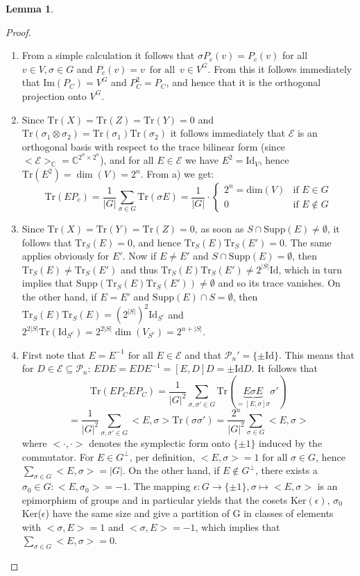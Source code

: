\documentclass[12pt,a4paper,BCOR15mm,twoside,DIV12]{article}
\def\P{\mathcal{P}}
\def\C{\mathbb{C}}
\def\supp{\text{Supp}}
\def\fa{\text{ for all }}
\def\Tr{\text{Tr}}
\def\Id{\text{Id}}
\newenvironment{bew}{\begin{proof}[Proof]}{\end{proof}}
\theoremstyle{definition}
\newtheorem{lem}[Satz]{Lemma}
\begin{document}
\begin{lem}
\begin{bew}
\begin{enumerate}
\item From a simple calculation it follows that $\sigma P_c(v) = P_c(v)$ for all $v \in V, \sigma \in G$ and $P_c(v) = v \, \fa \, v \in V^G$. From this it follows immediately that Im$(P_C) = V^G$ and $P_C^2 = P_C$, and hence that it is the orthogonal projection onto $V^G$.
\item Since $\Tr(X) = \Tr(Z) = \Tr(Y) = 0$ and $\Tr(\sigma_1 \otimes \sigma_2) = \Tr(\sigma_1)\Tr(\sigma_2)$ it follows immediately that $\mathcal{E}$ is an orthogonal basis with respect to the trace bilinear form (since $<\mathcal{E}>_\C = \C^{2^n \times 2^n}$), and for all $E \in \mathcal{E}$ we have $E^2 = \Id_V$, hence $\Tr(E^2) = \dim(V) = 2^n$.
From a) we get: \begin{equation} \Tr( E P_c) = \frac{1}{|G|} \sum_{\sigma \in G} \Tr(\sigma E) = \frac{1}{|G|} \cdot \left\{ \begin{array}{lr} 2^n = \text{dim}(V) & \text{if } E \in G \\ 0 & \text{if } E \notin G \end{array} \right. \end{equation}
\item Since $\Tr(X) = \Tr(Y) = \Tr(Z) = 0$, as soon as $S \cap \supp(E) \neq \emptyset$, it follows that $\Tr_S(E) = 0$, and hence $\Tr_S(E)\Tr_S(E') = 0$. The same applies obviously for $E'$. Now if $E \neq E'$ and $S \cap \supp(E) = \emptyset$, then $\Tr_S(E) \neq \Tr_S(E')$ and thus $\Tr_S(E)\Tr_S(E') \neq 2^{|S|} \Id $, which in turn implies that $\supp(\Tr_S(E)\Tr_S(E')) \neq \emptyset$ and so its trace vanishes.
On the other hand, if $E = E'$ and $\supp(E) \cap S = \emptyset$, then $\Tr_S(E)\Tr_S(E) = (2^{|S|})^2 \Id_{S^c}$ and $2^{2|S|} \Tr(\Id_{S^c}) = 2^{2|S|} \dim(V_{S^c}) = 2^{n + |S|}$.
\item First note that $E = E^{-1} \fa E \in \mathcal{E}$ and that $\P_n' = \{\pm \Id \}$. This means that for $D \in \mathcal{E} \subseteq \P_n $: $EDE = EDE^{-1} = [E,D]D = \pm \Id D$. It follows that
\begin{equation} \Tr(E P_C E P_C) = \frac{1}{|G|^2} \sum_{\sigma, \sigma' \in G} \Tr( \underbrace{E \sigma E}_{ = [E,\sigma]\sigma} \sigma') \end{equation}
\begin{equation} = \frac{1}{|G|^2} \sum_{\sigma, \sigma' \in G} <E,\sigma> \Tr( \sigma \sigma') =  \frac{2^n}{|G|^2} \sum_{\sigma \in G} <E,\sigma> \end{equation} where $< \cdot, \cdot >$ denotes the symplectic form onto $\{ \pm 1 \}$ induced by the commutator.
For $E \in G^\perp$, per definition, $<E,\sigma> = 1 \fa \sigma \in G$, hence $\sum_{\sigma \in G} <E,\sigma> = |G|$. On the other hand, if $E \notin G^\perp$, there exists a $\sigma_0 \in G: <E, \sigma_0> = -1$. The mapping $\epsilon: G \rightarrow \{ \pm 1 \}, \sigma \mapsto <E,\sigma>$ is an epimorphism of groups and 
in particular yields that the cosets Ker$(\epsilon)$, $\sigma_0$ Ker($\epsilon$) have the same size and give a partition of G in classes of elements with $<\sigma,E> = 1$ and $<\sigma,E> = -1$, which implies that $\sum_{\sigma \in G} <E,\sigma> = 0$.


\end{enumerate}
\end{bew}
\end{lem}
\end{document}
